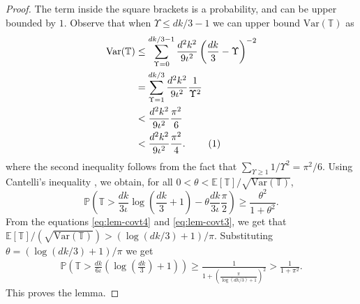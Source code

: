 \documentclass[opre,sglanonrev]{informs4}
\numberwithin{equation}{section}
\newcommand{\lp}{\left(}
\newcommand{\rp}{\right)}
\newcommand{\Var}{\mathrm{Var}}
\newcommand{\Pbb}{\mathbb{P}}
\newcommand{\Tbb}{\mathbb{T}}
\newcommand\numberthis{\addtocounter{equation}{1}\tag{\theequation}}
\newcommand{\prob}{\Pbb}
\newcommand{\expec}{\mathbb{E}}
\begin{document}
\begin{APPENDICES}
\begin{proof}
The term inside the square brackets is a probability, and can be upper bounded by $1$. 
Observe that when $\Upsilon\leq dk/3-1$ we can upper bound $\Var(\Tbb)$ as
\begin{align*}
    \Var( \Tbb) & \leq \sum_{\Upsilon=0}^{dk/3-1} \frac{d^2k^2}{9\iota^2}\lp\frac{dk}{3}-\Upsilon\rp^{-2}\\
    & = \sum_{\Upsilon=1}^{dk/3} \frac{d^2k^2}{9\iota^2}\frac{1}{\Upsilon^2}\\
    & < \frac{d^2k^2}{9\iota^2}\frac{\pi^2}{6}\\
    & < \frac{d^2k^2}{9\iota^2}\frac{\pi^2}{4}.~\numberthis\label{eq:lem-covt3}
\end{align*}
where the second inequality follows from the fact that $\sum_{\Upsilon\geq 1}1/\Upsilon^2=\pi^2/6$. 
Using Cantelli's inequality \citep[Equation 5]{ghosh2002probability}, we obtain, for all $0<\theta<{\expec[ \Tbb]}/{\sqrt{\Var( \Tbb)}}$,
\[
\prob\lp \Tbb>  \frac{dk}{3\iota}\log\lp \frac{dk}{3}+1\rp -\theta \frac{dk}{3\iota}\frac{\pi}{2}\rp\geq \frac{\theta^2}{1+\theta^2}.
\]
From the equations \ref{eq:lem-covt4} and \ref{eq:lem-covt3}, we get that ${\expec[ \Tbb]}/\lp{\sqrt{\Var( \Tbb)}}\rp>\lp\log(dk/3)+1 \rp/\pi$. Substituting $\theta={(\log(dk/3)+1)/\pi}$ we get
\begin{align*}
    \prob\lp\Tbb>  \frac{dk}{6\iota}\lp\log\lp\frac{dk}{3}\rp+1\rp \rp\geq \frac{1}{1+\lp\frac{\pi}{\log(dk/3)+1}\rp^2}> \frac{1}{1+\pi^2}.
\end{align*}
This proves the lemma.


\end{proof}


\end{APPENDICES}
% 
% 
% 
% 

% 
\printbibliography %
\end{document}
